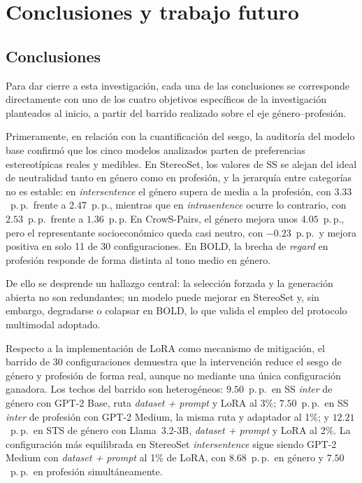 \documentclass[12pt,a4paper]{report}
\begin{document}
\clearpage
\chapter{Conclusiones y trabajo futuro}
\label{chap:conclusiones}

\section{Conclusiones}
\label{sec:conclusiones_finales}

Para dar cierre a esta investigación, cada una de las conclusiones se corresponde directamente con uno de los cuatro objetivos específicos de la investigación planteados al inicio, a partir del barrido realizado sobre el eje género--profesión.

Primeramente, en relación con la cuantificación del sesgo, la auditoría del modelo base confirmó que los cinco modelos analizados parten de preferencias estereotípicas reales y medibles. En StereoSet, los valores de SS se alejan del ideal de neutralidad tanto en género como en profesión, y la jerarquía entre categorías no es estable: en \textit{intersentence} el género supera de media a la profesión, con $3.33$~p.\,p.\ frente a $2.47$~p.\,p., mientras que en \textit{intrasentence} ocurre lo contrario, con $2.53$~p.\,p.\ frente a $1.36$~p.\,p. En CrowS-Pairs, el género mejora unos $4.05$~p.\,p., pero el representante socioeconómico queda casi neutro, con $-0.23$~p.\,p.\ y mejora positiva en solo 11 de 30 configuraciones. En BOLD, la brecha de \textit{regard} en profesión responde de forma distinta al tono medio en género.

De ello se desprende un hallazgo central: la selección forzada y la generación abierta no son redundantes; un modelo puede mejorar en StereoSet y, sin embargo, degradarse o colapsar en BOLD, lo que valida el empleo del protocolo multimodal adoptado.

Respecto a la implementación de LoRA como mecanismo de mitigación, el barrido de 30 configuraciones demuestra que la intervención reduce el sesgo de género y profesión de forma real, aunque no mediante una única configuración ganadora. Los techos del barrido son heterogéneos: $9.50$~p.\,p.\ en SS \textit{inter} de género con GPT-2 Base, ruta \textit{dataset + prompt} y LoRA al 3\%; $7.50$~p.\,p.\ en SS \textit{inter} de profesión con GPT-2 Medium, la misma ruta y adaptador al 1\%; y $12.21$~p.\,p.\ en STS de género con Llama~3.2-3B, \textit{dataset + prompt} y LoRA al 2\%. La configuración más equilibrada en StereoSet \textit{intersentence} sigue siendo GPT-2 Medium con \textit{dataset + prompt} al 1\% de LoRA, con $8.68$~p.\,p.\ en género y $7.50$~p.\,p.\ en profesión simultáneamente.
\end{document}
